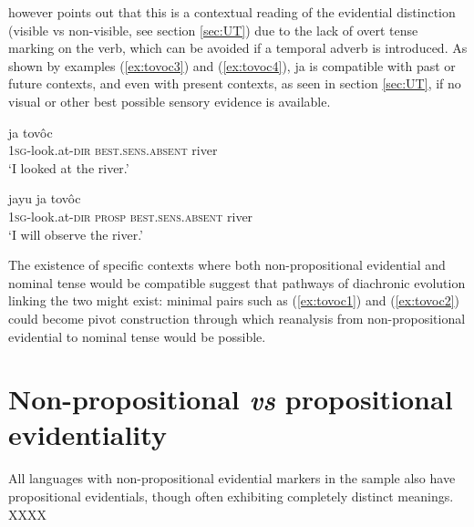 \documentclass[oneside,a4paper,11pt]{article}
\newcommand{\ipa}[1]{{\phon \mbox{#1}}} %
\begin{document}
\citet{gutierrez14determiners} however points out that this is a contextual reading of the evidential distinction (visible vs non-visible, see section \ref{sec:UT}) due to the lack of overt tense marking on the verb, which can be avoided if a temporal adverb is introduced. As shown by examples (\ref{ex:tovoc3}) and (\ref{ex:tovoc4}), \ipa{ja} is compatible with past or future contexts, and even with present contexts, as seen in section \ref{sec:UT}, if no visual or other best possible sensory evidence is available.


\begin{exe}
\ex \label{ex:tovoc3}
\gll \ipa{j-ovalh-ei} \ipa{ja} \ipa{tovôc} \\
 \textsc{1sg}-look.at-\textsc{dir} \textsc{best.sens.absent} river \\
\glt `I looked at the river.'
\end{exe}

\begin{exe}
\ex \label{ex:tovoc4}
\gll \ipa{j-ovalh-ei}  \ipa{jayu}   \ipa{ja} \ipa{tovôc} \\
 \textsc{1sg}-look.at-\textsc{dir} \textsc{prosp} \textsc{best.sens.absent} river \\
\glt `I will observe the river.'
\end{exe}

The existence of specific contexts where both non-propositional evidential and nominal tense would be compatible suggest that  pathways of diachronic evolution linking the two might exist: minimal pairs such as (\ref{ex:tovoc1}) and (\ref{ex:tovoc2}) could become pivot construction through which reanalysis from non-propositional evidential to nominal tense would be possible.

\section{Non-propositional \textit{vs} propositional evidentiality}
 All languages with non-propositional evidential markers in the sample also have propositional evidentials, though often exhibiting completely distinct meanings. XXXX


\end{document}
